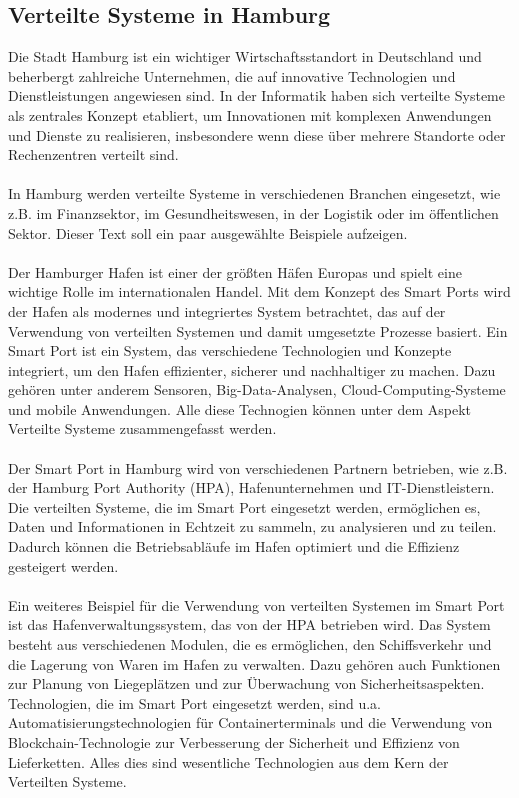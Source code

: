 \subsection{Verteilte Systeme in Hamburg}

Die Stadt Hamburg ist ein wichtiger Wirtschaftsstandort in Deutschland und beherbergt zahlreiche Unternehmen, die auf innovative Technologien und Dienstleistungen angewiesen sind. In der Informatik haben sich verteilte Systeme als zentrales Konzept etabliert, um Innovationen	 mit komplexen Anwendungen und Dienste zu realisieren, insbesondere wenn diese über mehrere Standorte oder Rechenzentren verteilt sind.
\\\\
In Hamburg werden verteilte Systeme in verschiedenen Branchen eingesetzt, wie z.B. im Finanzsektor, im Gesundheitswesen, in der Logistik oder im öffentlichen Sektor. Dieser Text soll ein paar ausgewählte Beispiele aufzeigen.
\\\\
Der Hamburger Hafen ist einer der größten Häfen Europas und spielt eine wichtige Rolle im internationalen Handel. Mit dem Konzept des Smart Ports wird der Hafen als modernes und integriertes System betrachtet, das auf der Verwendung von verteilten Systemen und damit umgesetzte Prozesse basiert.
Ein Smart Port ist ein System, das verschiedene Technologien und Konzepte integriert, um den Hafen effizienter, sicherer und nachhaltiger zu machen. Dazu gehören unter anderem Sensoren, Big-Data-Analysen, Cloud-Computing-Systeme und mobile Anwendungen. Alle diese Technogien können unter dem Aspekt Verteilte Systeme zusammengefasst werden.  
\\\\
Der Smart Port in Hamburg\cite{HPA} wird von verschiedenen Partnern betrieben, wie z.B. der Hamburg Port Authority (HPA), Hafenunternehmen und IT-Dienstleistern. Die verteilten Systeme, die im Smart Port eingesetzt werden, ermöglichen es, Daten und Informationen in Echtzeit zu sammeln, zu analysieren und zu teilen. Dadurch können die Betriebsabläufe im Hafen optimiert und die Effizienz gesteigert werden.
\\\\
Ein weiteres Beispiel für die Verwendung von verteilten Systemen im Smart Port ist das Hafenverwaltungssystem, das von der HPA betrieben wird. Das System besteht aus verschiedenen Modulen, die es ermöglichen, den Schiffsverkehr und die Lagerung von Waren im Hafen zu verwalten. Dazu gehören auch Funktionen zur Planung von Liegeplätzen und zur Überwachung von Sicherheitsaspekten.
Technologien, die im Smart Port eingesetzt werden, sind u.a. Automatisierungstechnologien für Containerterminals und die Verwendung von Blockchain-Technologie zur Verbesserung der Sicherheit und Effizienz von Lieferketten. Alles dies sind wesentliche Technologien aus dem Kern der Verteilten Systeme.

